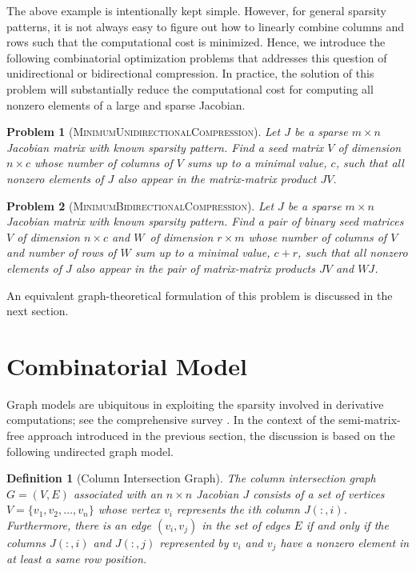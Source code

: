 \documentclass[12pt, oneside]{book}
\newtheorem{problem}{Problem}
\newtheorem{definition}{Definition}
\newcommand{\col}{\ensuremath{c}}
\newcommand{\row}{\ensuremath{r}}
\newcommand{\MinUniCom}{\textsc{MinimumUnidirectionalCompression}}
\newcommand{\MinBidCom}{\textsc{MinimumBidirectionalCompression}}
\begin{document}
The above example is intentionally kept simple. However, for general sparsity patterns,
it is not always easy to figure out how to linearly combine columns and rows such that
the computational cost is minimized. Hence, we introduce the following combinatorial
optimization problems that addresses this question of unidirectional or bidirectional compression. 
In practice, the solution of this
problem will substantially reduce the computational cost for computing all nonzero
elements of a large and sparse Jacobian.

\begin{problem}[\MinUniCom]
\label{p.seed.uni} Let $J$ be a sparse ${m\times n}$ Jacobian matrix with known sparsity
pattern. Find a seed matrix $V$ of dimension $n\times \col$ 
whose number of columns of $V$ sums up
to a minimal value, $\col$, such that all nonzero elements of $J$ also appear in
the matrix-matrix product $JV$.
\end{problem}

\begin{problem}[\MinBidCom]
\label{p.seed.bid} Let $J$ be a sparse ${m\times n}$ Jacobian matrix with known sparsity
pattern. Find a pair of binary seed matrices $V$ of dimension $n\times \col$ and $W$~of
dimension $\row \times m$ whose number of columns of $V$ and number of rows of $W$ sum up
to a minimal value, $\col + \row$, such that all nonzero elements of $J$ also appear in
the pair of matrix-matrix products $JV$ and $WJ$.
\end{problem}

An equivalent graph-theoretical formulation of this problem is discussed in the next
section.

\section{Combinatorial Model}
\label{s.modeling}
Graph models are ubiquitous in exploiting the sparsity involved in derivative
computations; see the comprehensive survey \cite{Gebremedhin05whatcolor}. In the context of the
semi-matrix-free approach introduced in the previous section, the discussion is based on
the following undirected graph model.
%
\begin{definition}[Column Intersection Graph]
\label{d:cig}
The column intersection graph $G = (V,E)$ associated with an $n \times n$ Jacobian $J$
consists of a set of vertices $V=\{v_1, v_2, \dots, v_n\}$ whose vertex $v_i$ represents
the $i$th column $J(:,i)$. Furthermore, there is an edge $(v_i,v_j)$ in the set of edges
$E$ if and only if the columns $J(:,i)$ and $J(:,j)$ represented by $v_i$ and $v_j$ have
a nonzero element in at least a same row position.
\end{definition}
\end{document}
